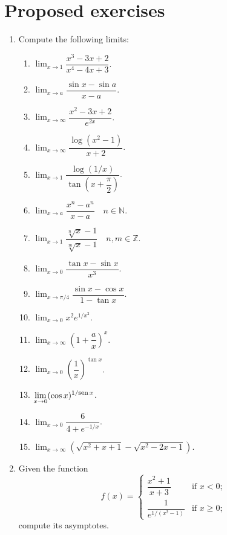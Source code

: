 \section{Proposed exercises}
\begin{enumerate}[leftmargin=*]
\item Compute the following limits:
\begin{multicols}{2}
\begin{enumerate}
\item $\displaystyle \lim_{x\rightarrow 1}\dfrac{x^3-3x+2}{x^4-4x+3}$.
\item $\displaystyle \lim_{x\rightarrow a}\dfrac{\sin x-\sin a}{x-a}$.
\item $\displaystyle \lim_{x\rightarrow\infty}\dfrac{x^2-3x+2}{e^{2x}}$.
\item $\displaystyle \lim_{x\rightarrow\infty}\dfrac{\log(x^2-1)}{x+2}$.
\item $\displaystyle \lim_{x\rightarrow 1}\dfrac{\log(1/x)}{\tan(x+\dfrac{\pi}{2})}$.
\item $\displaystyle \lim_{x\rightarrow a}\dfrac{x^n-a^n}{x-a}\quad n\in \mathbb{N}$.
\item $\displaystyle \lim_{x\rightarrow 1}\dfrac{\sqrt[n]{x}-1}{\sqrt[m]{x}-1}\quad n,m \in \mathbb{Z}$.
\item $\displaystyle \lim_{x\rightarrow 0}\dfrac{\tan x-\sin x}{x^3}$.
\item $\displaystyle \lim_{x\rightarrow \pi/4}\dfrac{\sin x-\cos x}{1-\tan x}$.
\item $\displaystyle \lim_{x\rightarrow 0}x^2e^{1/x^2}$.
\item $\displaystyle \lim_{x\rightarrow \infty}\left(1+\dfrac{a}{x}\right)^x$.
\item $\displaystyle \lim_{x\rightarrow 0}\left(\dfrac{1}{x}\right)^{\tan x}$.
\item $\displaystyle \lim_{x\rightarrow 0}(\cos x)^{1/\mbox{\footnotesize sen}\, x}$.
\item $\displaystyle \lim_{x\rightarrow 0}\dfrac{6}{4+e^{-1/x}}$.
\item $\displaystyle \lim_{x\rightarrow \infty}\left(\sqrt{x^2+x+1}-\sqrt{x^2-2x-1}\right)$.
\end{enumerate}
\end{multicols}

\item Given the function 
\[
f(x) = 
\begin{cases}
\dfrac{x^2+1}{x+3} & \mbox{if $x<0$}; \\
\dfrac{1}{e^{1/(x^2-1)}} & \mbox{if $x\geq 0$;}
\end{cases} 
\]
compute its asymptotes.


\end{enumerate}
